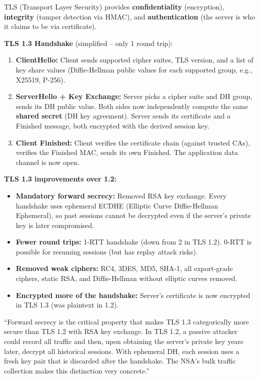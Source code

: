 \documentclass[11pt, letterpaper]{article}
\newcommand{\talkingpoint}[1]{%
  \begin{tcolorbox}[colback=talkbg, colframe=talkborder,
    title={\bfseries Interview Talking Point}, arc=3pt, boxrule=1pt]
  #1
  \end{tcolorbox}%
}
\begin{document}
TLS (Transport Layer Security) provides \textbf{confidentiality} (encryption), \textbf{integrity} (tamper detection via HMAC), and \textbf{authentication} (the server is who it claims to be via certificate).

\textbf{TLS 1.3 Handshake} (simplified -- only 1 round trip):
\begin{enumerate}[noitemsep]
  \item \textbf{ClientHello:} Client sends supported cipher suites, TLS version, and a list of key share values (Diffie-Hellman public values for each supported group, e.g., X25519, P-256).
  \item \textbf{ServerHello + Key Exchange:} Server picks a cipher suite and DH group, sends its DH public value. Both sides now independently compute the same \textbf{shared secret} (DH key agreement). Server sends its certificate and a Finished message, both encrypted with the derived session key.
  \item \textbf{Client Finished:} Client verifies the certificate chain (against trusted CAs), verifies the Finished MAC, sends its own Finished. The application data channel is now open.
\end{enumerate}

\begin{tcolorbox}[colback=part4bg, colframe=sectionorange, arc=3pt, boxrule=1pt]
\textbf{TLS 1.3 improvements over 1.2:}
\begin{itemize}[noitemsep, leftmargin=*]
  \item \textbf{Mandatory forward secrecy:} Removed RSA key exchange. Every handshake uses ephemeral ECDHE (Elliptic Curve Diffie-Hellman Ephemeral), so past sessions cannot be decrypted even if the server's private key is later compromised.
  \item \textbf{Fewer round trips:} 1-RTT handshake (down from 2 in TLS 1.2). 0-RTT is possible for resuming sessions (but has replay attack risks).
  \item \textbf{Removed weak ciphers:} RC4, 3DES, MD5, SHA-1, all export-grade ciphers, static RSA, and Diffie-Hellman without elliptic curves removed.
  \item \textbf{Encrypted more of the handshake:} Server's certificate is now encrypted in TLS 1.3 (was plaintext in 1.2).
\end{itemize}
\end{tcolorbox}

\talkingpoint{``Forward secrecy is the critical property that makes TLS 1.3 categorically more secure than TLS 1.2 with RSA key exchange. In TLS 1.2, a passive attacker could record all traffic and then, upon obtaining the server's private key years later, decrypt all historical sessions. With ephemeral DH, each session uses a fresh key pair that is discarded after the handshake. The NSA's bulk traffic collection makes this distinction very concrete.''}
\end{document}
